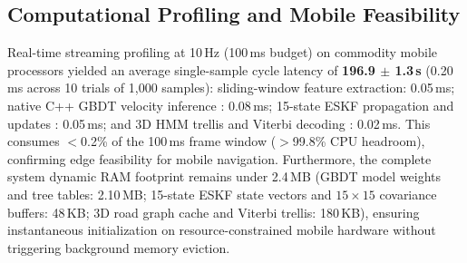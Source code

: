 \documentclass[conference]{IEEEtran}
\begin{document}
\begin{table}[!htbp]
\centering
\caption{Real-World Smartphone On-Road Validation vs.\ RTK Ground Truth (Prayagraj 3.2\,km Urban Corridor, Mean $\pm$ Std.\ Dev.\ over 10 Trials)}
\label{tab:realworld}
\footnotesize
\renewcommand{\arraystretch}{1.08}
\end{table}

\subsection{Computational Profiling and Mobile Feasibility}
Real-time streaming profiling at 10\,Hz (100\,ms budget) on commodity mobile processors yielded an average single-sample cycle latency of \textbf{196.9 $\pm$ 1.3\,\textmu s} (0.20\,ms across 10 trials of 1,000 samples): sliding-window feature extraction: 0.05\,ms; native C++ GBDT velocity inference \cite{friedman2001}: 0.08\,ms; 15-state ESKF propagation and updates \cite{sola2017}: 0.05\,ms; and 3D HMM trellis and Viterbi decoding \cite{newson2009}: 0.02\,ms. This consumes $<$0.2\% of the 100\,ms frame window ($>$99.8\% CPU headroom), confirming edge feasibility for mobile navigation. Furthermore, the complete system dynamic RAM footprint remains under 2.4\,MB (GBDT model weights and tree tables: 2.10\,MB; 15-state ESKF state vectors and $15\times 15$ covariance buffers: 48\,KB; 3D road graph cache and Viterbi trellis: 180\,KB), ensuring instantaneous initialization on resource-constrained mobile hardware without triggering background memory eviction.
\end{document}
